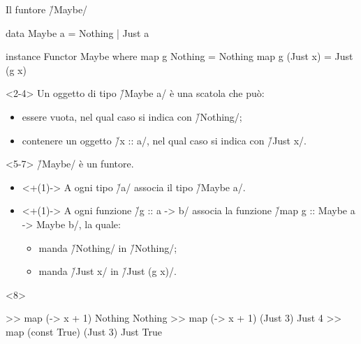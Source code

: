\begin{frame}[fragile]{\secname}{Il funtore \h/Maybe/}
\begin{overlayarea}{\textwidth}{0.7\textheight}
\begin{haskellcode}
data Maybe a = Nothing | Just a

instance Functor Maybe where
    map g Nothing = Nothing
    map g (Just x) = Just (g x)
\end{haskellcode}

\begin{onlyenv}<2-4>
Un oggetto di tipo \h/Maybe a/ è una scatola che può:
\pause
\begin{itemize}[<+(1)->]
\item essere vuota, nel qual caso si indica con \h/Nothing/;
\item contenere un oggetto \h/x :: a/, nel qual caso si indica con \h/Just x/.
\end{itemize}
\end{onlyenv}

\begin{onlyenv}<5-7>
\h/Maybe/ è un funtore.
\pause
\begin{itemize}
\item<+(1)-> A ogni tipo \h/a/ associa il tipo \h/Maybe a/.
\item<+(1)-> A ogni funzione \h/g :: a -> b/ associa la funzione \h/map g :: Maybe a -> Maybe b/, la quale:
\begin{itemize}
\item manda \h/Nothing/ in \h/Nothing/;
\item manda \h/Just x/ in \h/Just (g x)/.
\end{itemize}
\end{itemize}
\end{onlyenv}

\begin{onlyenv}<8>
\begin{runhaskell}
>>  map (\x -> x + 1) Nothing
    Nothing
>>  map (\x -> x + 1) (Just 3)
    Just 4
>>  map (const True) (Just 3)
    Just True
\end{runhaskell}
\end{onlyenv}
\end{overlayarea}
\end{frame}

